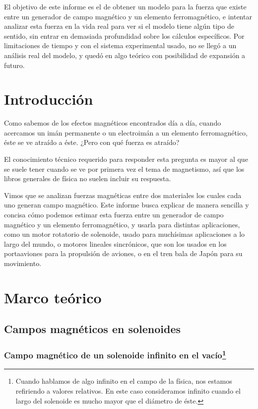 \documentclass[a4paper,12pt]{article}
\begin{document}
    El objetivo de este informe es el de obtener un modelo para la fuerza que existe entre un generador de campo magnético y un elemento ferromagnético, e intentar analizar esta fuerza en la vida real para ver si el modelo tiene algún tipo de sentido, sin entrar en demasiada profundidad sobre los cálculos específicos. Por limitaciones de tiempo y con el sistema experimental usado, no se llegó a un análisis real del modelo, y quedó en algo teórico con posibilidad de expansión a futuro.

\section*{Introducción}

    Como sabemos de los efectos magnéticos encontrados día a día, cuando acercamos un imán permanente o un electroimán a un elemento ferromagnético, éste se ve atraído a éste. ¿Pero con qué fuerza es atraído?

    El conocimiento técnico requerido para responder esta pregunta es mayor al que se suele tener cuando se ve por primera vez el tema de magnetismo, así que los libros generales de física no suelen incluir su respuesta. 
    
    Vimos que se analizan fuerzas magnéticas entre dos materiales los cuales cada uno generan campo magnético. Este informe busca explicar de manera sencilla y concisa cómo podemos estimar esta fuerza entre un generador de campo magnético y un elemento ferromagnético, y usarla para distintas aplicaciones, como un motor rotatorio de solenoide, usado para muchísimas aplicaciones a lo largo del mundo, o motores lineales sincrónicos, que son los usados en los portaaviones para la propulsión de aviones, o en el tren bala de Japón para su movimiento.

\section*{Marco teórico}

    \subsection*{Campos magnéticos en solenoides}

    \subsubsection*{Campo magnético de un solenoide infinito en el vacío\footnote{Cuando hablamos de algo infinito en el campo de la física, nos estamos refiriendo a valores relativos. En este caso consideramos infinito cuando el largo del solenoide es mucho mayor que el diámetro de éste.}}
\end{document}
